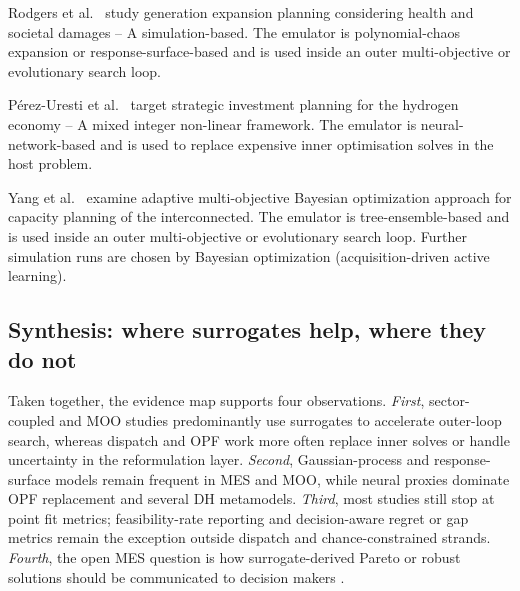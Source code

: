Rodgers et al.~\cite{Rodgers2018951} study generation expansion planning considering health and societal damages – A simulation-based. The emulator is polynomial-chaos expansion or response-surface-based and is used inside an outer multi-objective or evolutionary search loop.

Pérez-Uresti et al.~\cite{Pérez-Uresti2023} target strategic investment planning for the hydrogen economy – A mixed integer non-linear framework. The emulator is neural-network-based and is used to replace expensive inner optimisation solves in the host problem.

Yang et al.~\cite{Yang2025} examine adaptive multi-objective Bayesian optimization approach for capacity planning of the interconnected. The emulator is tree-ensemble-based and is used inside an outer multi-objective or evolutionary search loop. Further simulation runs are chosen by Bayesian optimization (acquisition-driven active learning).

\subsection{Synthesis: where surrogates help, where they do not}
\label{sec:apps:synthesis}

Taken together, the evidence map supports four observations.
\emph{First}, sector-coupled and MOO studies predominantly use surrogates
to accelerate outer-loop search, whereas dispatch and OPF work more often
replace inner solves or handle uncertainty in the reformulation layer.
\emph{Second}, Gaussian-process and response-surface models remain frequent
in MES and MOO, while neural proxies dominate OPF replacement and several
DH metamodels. \emph{Third}, most studies still stop at point fit metrics;
feasibility-rate reporting and decision-aware regret or gap metrics remain
the exception outside dispatch and chance-constrained strands.
\emph{Fourth}, the open MES question is how surrogate-derived Pareto or robust
solutions should be communicated to decision makers
\cite{Mylonopoulos202332697,Lim2025}.
